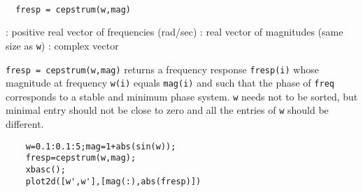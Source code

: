 
\begin{mandesc}
   \\ %
\end{mandesc}
\begin{calling_sequence}
\begin{verbatim}
  fresp = cepstrum(w,mag)  
\end{verbatim}
\end{calling_sequence}
\begin{parameters}
  \begin{varlist}
    : positive real vector of frequencies (rad/sec)
    : real vector of magnitudes (same size as \verb!w!)
    : complex vector
  \end{varlist}
\end{parameters}
\begin{mandescription}
  \verb!fresp = cepstrum(w,mag)! returns a frequency response \verb!fresp(i)!
  whose magnitude at frequency \verb!w(i)! equals \verb!mag(i)!  and such
  that the phase of \verb!freq! corresponds to a stable and minimum phase
  system. \verb!w! needs not to be sorted, but  minimal entry should not be
  close to zero and all the entries of \verb!w! should be different.
\end{mandescription}
\begin{examples}
  \begin{Verbatim}
    w=0.1:0.1:5;mag=1+abs(sin(w));
    fresp=cepstrum(w,mag);
    xbasc();
    plot2d([w',w'],[mag(:),abs(fresp)])
  \end{Verbatim}
\end{examples}
\begin{manseealso}
\end{manseealso}
